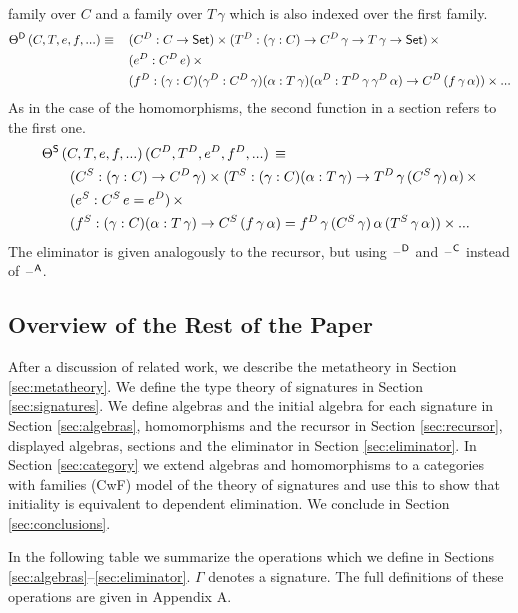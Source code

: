 \documentclass[acmsmall,screen]{acmart}
\begin{document}
family over $C$ and a family over $T\,\gamma$ which is also indexed
over the first family.
\begin{alignat*}{5}
  & \Theta^{\mathsf{D}}\,(C,T,e,f,...)\equiv\, && (C^D:C\rightarrow \mathsf{Set})\times(T^D:(\gamma:C)\rightarrow C^D\,\gamma\rightarrow T\,\gamma\rightarrow \mathsf{Set})\,\times \\
  & && (e^D:C^D\,e)\,\times \\
  & && (f^D:(\gamma:C)(\gamma^D:C^D\,\gamma)(\alpha:T\,\gamma)(\alpha^D:T^D\,\gamma\,\gamma^D\,\alpha)\rightarrow C^D\,(f\,\gamma\,\alpha))\times...
\end{alignat*}
As in the case of the homomorphisms, the second function in a section
refers to the first one.
\begin{alignat*}{5}
  & \Theta^{\mathsf{S}}\,(C,T,e,f,...)\,(C^D,T^D,e^D,f^D,...)\,\equiv \\
  & \hspace{2em} (C^S:(\gamma:C)\rightarrow C^D\,\gamma)\times(T^S:(\gamma:C)(\alpha:T\,\gamma)\rightarrow T^D\,\gamma\,(C^S\,\gamma)\,\alpha)\,\times \\
  & \hspace{2em} (e^S:C^S\,e=e^D)\,\times \\
  & \hspace{2em} (f^S:(\gamma:C)(\alpha:T\,\gamma)\rightarrow C^S\,(f\,\gamma\,\alpha)=f^D\,\gamma\,(C^S\,\gamma)\,\alpha\,(T^S\,\gamma\,\alpha))\times ...
\end{alignat*}
The eliminator is given analogously to the recursor, but using
$\mathord{\hspace{1pt}\text{--}\hspace{1pt}}^{\mathsf{D}}$ and $\mathord{\hspace{1pt}\text{--}\hspace{1pt}}^{\mathsf{C}}$ instead of $\mathord{\hspace{1pt}\text{--}\hspace{1pt}}^{\mathsf{A}}$.

\subsection{Overview of the Rest of the Paper}

After a discussion of related work, we describe the metatheory in
Section \ref{sec:metatheory}. We define the type theory of signatures
in Section \ref{sec:signatures}. We define algebras and the initial
algebra for each signature in Section \ref{sec:algebras},
homomorphisms and the recursor in Section \ref{sec:recursor},
displayed algebras, sections and the eliminator in Section
\ref{sec:eliminator}. In Section \ref{sec:category} we extend algebras
and homomorphisms to a categories with families (CwF) model of the
theory of signatures and use this to show that initiality
is equivalent to dependent elimination. We conclude in
Section \ref{sec:conclusions}.

In the following table we summarize the operations which we define in
Sections \ref{sec:algebras}--\ref{sec:eliminator}. $\Gamma$ denotes a
signature. The full definitions of these operations are given in
Appendix A.
\end{document}

